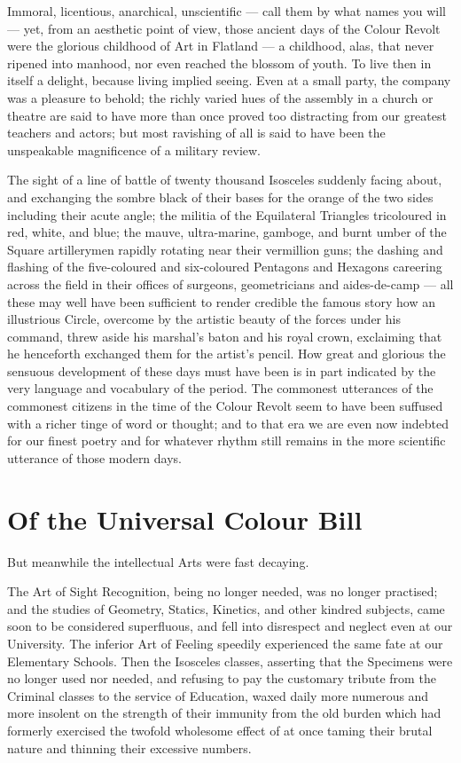 \documentclass[12pt, a4paper, twoside]{memoir}
\begin{document}
Immoral, licentious, anarchical, unscientific --- call them by what names you
will --- yet, from an aesthetic point of view, those ancient days of the Colour
Revolt were the glorious childhood of Art in Flatland --- a childhood, alas,
that never ripened into manhood, nor even reached the blossom of youth. To
live then in itself a delight, because living implied seeing. Even at a small
party, the company was a pleasure to behold; the richly varied hues of the
assembly in a church or theatre are said to have more than once proved too
distracting from our greatest teachers and actors; but most ravishing of all
is said to have been the unspeakable magnificence of a military review.

The sight of a line of battle of twenty thousand
Isosceles suddenly facing about, and exchanging the sombre black of their
bases for the orange of the two sides including their acute angle; the militia
of the Equilateral Triangles tricoloured in red, white, and blue; the mauve,
ultra-marine, gamboge, and burnt umber of the Square artillerymen rapidly
rotating near their vermillion guns; the dashing and flashing of the
five-coloured and six-coloured Pentagons and Hexagons careering across the
field in their offices of surgeons, geometricians and aides-de-camp --- all
these may well have been sufficient to render credible the famous story how an
illustrious Circle, overcome by the artistic beauty of the forces under his
command, threw aside his marshal's baton and his royal crown, exclaiming that
he henceforth exchanged them for the artist's pencil. How great and glorious
the sensuous development of these days must have been is in part indicated by
the very language and vocabulary of the period. The commonest utterances of
the commonest citizens in the time of the Colour Revolt seem to have been
suffused with a richer tinge of word or thought; and to that era we are even
now indebted for our finest poetry and for whatever rhythm still remains in
the more scientific utterance of those modern days.


\chapter{Of the Universal Colour Bill}
But meanwhile the intellectual Arts were fast decaying.

The Art of Sight Recognition, being no longer needed, was no longer practised;
and the studies of Geometry, Statics, Kinetics, and other kindred subjects,
came soon to be considered superfluous, and fell into disrespect and neglect
even at our University. The inferior Art of Feeling speedily experienced the
same fate at our Elementary Schools. Then the Isosceles classes, asserting
that the Specimens were no longer used nor needed, and refusing to pay the
customary tribute from the Criminal classes to the service of Education, waxed
daily more numerous and more insolent on the strength of their immunity from
the old burden which had formerly exercised the twofold wholesome effect of at
once taming their brutal nature and thinning their excessive numbers.
\end{document}
